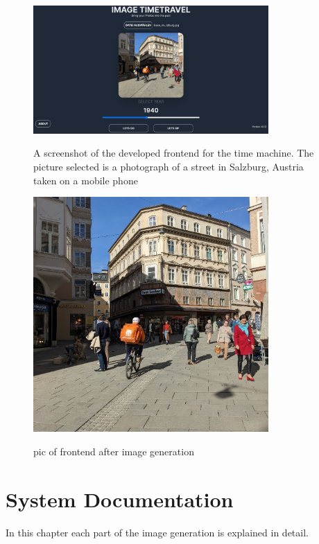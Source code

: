 \documentclass[english,notitlepage,smartquotes]{hgbreport}
\begin{document}
\begin{figure}[htbp]
    \centering\small
    {\includegraphics[width=0.8\textwidth]{images/frontendPre.png}}
    \caption{A screenshot of the developed frontend for the time machine. The picture selected is a photograph of a street in Salzburg, Austria taken on a mobile phone}
    \label{fig:frontendPre}
\end{figure}

\begin{figure}[htbp]
    \centering\small
    {\includegraphics[width=0.8\textwidth]{images/base_image_Salzburg.jpg}}
    \caption{pic of frontend after image generation}
    \label{fig:frontendPost}
\end{figure}

\chapter{System Documentation}
\label{systemDocu}
In this chapter each part of the image generation is explained in detail.
\end{document}

